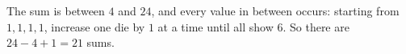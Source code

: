 The sum is between $4$ and $24$, and every value in between occurs: starting from $1,1,1,1$, increase one die by $1$ at a time until all show $6$. So there are $24-4+1=\boxed{21}$ sums.
